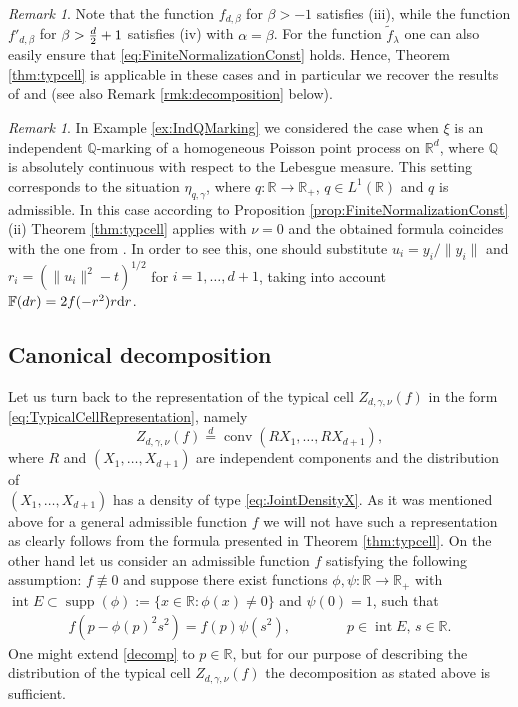 \documentclass[11pt,a4paper]{article}
\theoremstyle{plain}
\theoremstyle{definition}
\theoremstyle{remark}
\newtheorem{remark}[theorem]{Remark}
\DeclareMathOperator\supp{supp}
\def\FF{\mathbb{F}}
\def\QQ{\mathbb{Q}}
\def\RR{\mathbb{R}}
\newcommand{\dd}{{\rm d}}
\newcommand{\conv}{\mathop{\mathrm{conv}}\nolimits}
\newcommand{\inter}{\operatorname{int}}
\begin{document}
\begin{remark}
    Note that the function $f_{d,\beta}$ for $\beta>-1$ satisfies (iii), while the function $f'_{d,\beta}$ for $\beta>{d\over 2}+1$ satisfies (iv) with $\alpha=\beta$. For the function $\widetilde f_{\lambda}$ one can also easily ensure that \eqref{eq:FiniteNormalizationConst} holds. Hence, Theorem \ref{thm:typcell} is applicable in these cases and in particular we recover the results of \cite[Theorem 4.5]{GKT20} and \cite[Theorem 5.1]{GKT21} (see also Remark \ref{rmk:decomposition} below).
\end{remark}

\begin{remark}
     In Example \ref{ex:IndQMarking} we considered the case when $\xi$ is an independent $\QQ$-marking of a homogeneous Poisson point process on $\RR^d$, where $\QQ$ is absolutely continuous with respect to the Lebesgue measure. This setting corresponds to the situation $\eta_{q,\gamma}$, where $q:\RR\to\RR_+$, $q\in L^1(\RR)$ and $q$ is admissible. In this case according to Proposition \ref{prop:FiniteNormalizationConst} (ii) Theorem \ref{thm:typcell} applies with $\nu=0$ and the obtained formula coincides with the one from \cite[Theorem 3.3.1]{Ldoc}. In order to see this, one should substitute  $u_i=y_i/\|y_i\|$ and $r_i=(\|u_i\|^2-t)^{1/2}$ for $i=1,\dots,d+1$, taking into account $\FF(dr)=2f(-r^2)r\dd r$.
\end{remark}

\subsection{Canonical decomposition}

Let us turn back to the representation of the typical cell $Z_{d,\gamma,\nu}(f)$ in the form \eqref{eq:TypicalCellRepresentation}, namely
\[
    Z_{d,\gamma,\nu}(f)\overset{d}{=}\conv(RX_1,\ldots,RX_{d+1}),
\]
where $R$ and $(X_1,\ldots,X_{d+1})$ are independent components and the distribution of \\$(X_1,\ldots,X_{d+1})$ has a density of type \eqref{eq:JointDensityX}. As it was mentioned above for a general admissible function $f$ we will not have such a representation as clearly follows from the formula presented in Theorem \ref{thm:typcell}. On the other hand let us consider an admissible function $f$ satisfying the following assumption: $f\not\equiv 0$ and suppose there exist functions $\phi,\psi\colon \RR \to\RR_+$ with $\inter E\subset \supp(\phi):= \{x\in \RR: \phi(x)\neq 0\}$ and $\psi(0)=1$, such that
\begin{align}\label{decomp}
    f(p-\phi(p)^2s^2)=f(p)\psi(s^2),\qquad\qquad p\in \inter E,\, s\in \RR.
\end{align}
One might extend \eqref{decomp} to $p\in \RR$, but for our purpose of describing the distribution of the typical cell $Z_{d,\gamma,\nu}(f)$ the decomposition as stated above is sufficient. 
\end{document}
